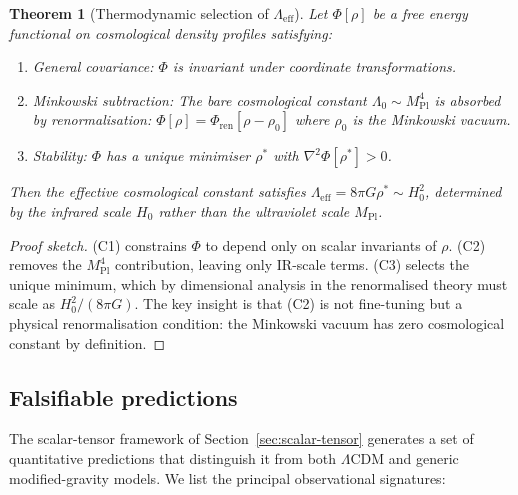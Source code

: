 \documentclass[12pt,a4paper]{article}
\theoremstyle{definition}
\theoremstyle{plain}
\newtheorem{theorem}[definition]{Theorem}
\theoremstyle{remark}
\begin{document}
\begin{theorem}[Thermodynamic selection of $\Lambda_{\mathrm{eff}}$]
\label{thm:lambda-selection}
Let $\Phi[\rho]$ be a free energy functional on cosmological density profiles satisfying:
\begin{enumerate}
\item[\textup{(C1)}] \emph{General covariance:} $\Phi$ is invariant under coordinate transformations.
\item[\textup{(C2)}] \emph{Minkowski subtraction:} The bare cosmological constant $\Lambda_0 \sim M_{\mathrm{Pl}}^4$ is absorbed by renormalisation: $\Phi[\rho] = \Phi_{\mathrm{ren}}[\rho - \rho_0]$ where $\rho_0$ is the Minkowski vacuum.
\item[\textup{(C3)}] \emph{Stability:} $\Phi$ has a unique minimiser $\rho^*$ with $\nabla^2 \Phi[\rho^*] > 0$.
\end{enumerate}
Then the effective cosmological constant satisfies $\Lambda_{\mathrm{eff}} = 8\pi G \rho^* \sim H_0^2$, determined by the infrared scale $H_0$ rather than the ultraviolet scale $M_{\mathrm{Pl}}$.
\end{theorem}

\begin{proof}[Proof sketch]
(C1) constrains $\Phi$ to depend only on scalar invariants of $\rho$.
(C2) removes the $M_{\mathrm{Pl}}^4$ contribution, leaving only IR-scale terms.
(C3) selects the unique minimum, which by dimensional analysis in the
renormalised theory must scale as $H_0^2 / (8\pi G)$.
The key insight is that (C2) is not fine-tuning but a physical
renormalisation condition: the Minkowski vacuum has zero cosmological
constant by definition.
\end{proof}

\subsection{Falsifiable predictions}\label{sec:predictions-falsifiable}

The scalar-tensor framework of Section~\ref{sec:scalar-tensor} generates
a set of quantitative predictions that distinguish it from both
$\Lambda$CDM and generic modified-gravity models. We list the principal
observational signatures:
\end{document}
